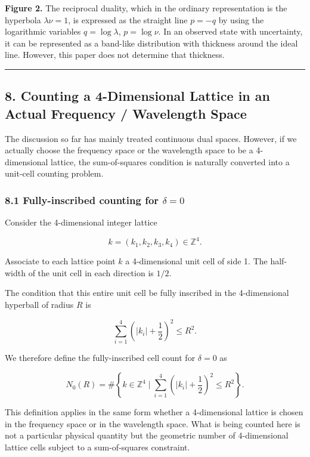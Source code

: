 \documentclass[
]{article}
\begin{document}
\textbf{Figure 2.} The reciprocal duality, which in the ordinary
representation is the hyperbola \(\lambda\nu=1\), is expressed as the
straight line \(p=-q\) by using the logarithmic variables
\(q=\log\lambda\), \(p=\log\nu\). In an observed state with uncertainty,
it can be represented as a band-like distribution with thickness around
the ideal line. However, this paper does not determine that thickness.

\begin{center}\rule{0.5\linewidth}{0.5pt}\end{center}

\subsection{8. Counting a 4-Dimensional Lattice in an Actual Frequency /
Wavelength
Space}\label{counting-a-4-dimensional-lattice-in-an-actual-frequency-wavelength-space}

The discussion so far has mainly treated continuous dual spaces.
However, if we actually choose the frequency space or the wavelength
space to be a 4-dimensional lattice, the sum-of-squares condition is
naturally converted into a unit-cell counting problem.

\subsubsection{\texorpdfstring{8.1 Fully-inscribed counting for
\(\delta=0\)}{8.1 Fully-inscribed counting for \textbackslash delta=0}}\label{fully-inscribed-counting-for-delta0}

Consider the 4-dimensional integer lattice

\[
k=(k_1,k_2,k_3,k_4)\in\mathbb{Z}^4 .
\]

Associate to each lattice point \(k\) a 4-dimensional unit cell of side
1. The half-width of the unit cell in each direction is \(1/2\).

The condition that this entire unit cell be fully inscribed in the
4-dimensional hyperball of radius \(R\) is

\[
\sum_{i=1}^{4}
\left(|k_i|+\frac12\right)^2
\le R^2 .
\]

We therefore define the fully-inscribed cell count for \(\delta=0\) as

\[
N_0(R)
=
\#\left\{
k\in\mathbb{Z}^4
\mid
\sum_{i=1}^{4}
\left(|k_i|+\frac12\right)^2
\le R^2
\right\} .
\]

This definition applies in the same form whether a 4-dimensional lattice
is chosen in the frequency space or in the wavelength space. What is
being counted here is not a particular physical quantity but the
geometric number of 4-dimensional lattice cells subject to a
sum-of-squares constraint.
\end{document}
